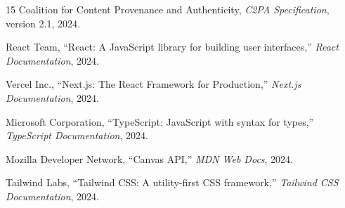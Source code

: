 \documentclass[14pt,a4paper,oneside]{report}
\begin{document}
\begin{thebibliography}{15}
 Coalition for Content Provenance and Authenticity, \textit{C2PA Specification}, version 2.1, 2024.

 React Team, ``React: A JavaScript library for building user interfaces,'' \textit{React Documentation}, 2024.

 Vercel Inc., ``Next.js: The React Framework for Production,'' \textit{Next.js Documentation}, 2024.

 Microsoft Corporation, ``TypeScript: JavaScript with syntax for types,'' \textit{TypeScript Documentation}, 2024.

 Mozilla Developer Network, ``Canvas API,'' \textit{MDN Web Docs}, 2024.

 Tailwind Labs, ``Tailwind CSS: A utility-first CSS framework,'' \textit{Tailwind CSS Documentation}, 2024.

\end{thebibliography}
\end{document}
